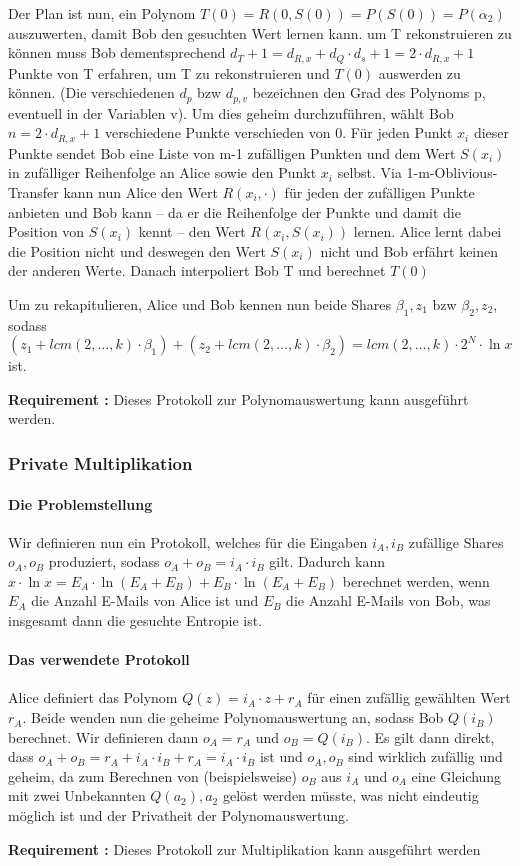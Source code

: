 \documentclass{article}
\newcounter{requirementscount}{}
\newcommand{\requirement}[1] {
        \addtocounter{requirementscount}{1}
        {\bf Requirement \therequirementscount:} #1\\
    }
\begin{document}
Der Plan ist nun, ein Polynom \(T(0) = R(0,S(0)) = P(S(0)) = P(\alpha_2)\)
auszuwerten, damit Bob den gesuchten Wert lernen kann. um T rekonstruieren
zu k\"onnen muss Bob dementsprechend 
\(d_T + 1 = d_{R,x} + d_Q \cdot d_s +1= 2\cdot d_{R,x}+1\) 
Punkte von T erfahren,
um T zu rekonstruieren und \(T(0)\) auswerden zu k\"onnen. (Die verschiedenen
\(d_p\) bzw \(d_{p,v}\) bezeichnen den Grad des Polynoms p, eventuell in der
Variablen v). Um dies geheim durchzuf\"uhren, w\"ahlt Bob \(n = 2 \cdot d_{R,x}+1\)
verschiedene Punkte verschieden von 0. F\"ur jeden Punkt \(x_i\) dieser Punkte
sendet Bob eine Liste von m-1 zuf\"alligen Punkten und dem Wert \(S(x_i)\) 
in zuf\"alliger Reihenfolge an Alice sowie den Punkt \(x_i\) selbst.
Via 1-m-Oblivious-Transfer kann nun Alice den Wert \(R(x_i, \cdot)\) f\"ur jeden
der zuf\"alligen Punkte anbieten und Bob kann -- da er die Reihenfolge der
Punkte und damit die Position von \(S(x_i)\) kennt -- den Wert \(R(x_i, S(x_i))\)
lernen. Alice lernt dabei die Position nicht und deswegen den Wert \(S(x_i)\)
nicht und Bob erf\"ahrt keinen der anderen Werte. Danach interpoliert Bob T und berechnet 
\(T(0)\)

Um zu rekapitulieren, Alice und Bob kennen nun beide Shares \(\beta_1, z_1\) bzw 
\(\beta_2, z_2\), sodass 
\((z_1 + lcm(2,\dots,k)\cdot\beta_1) + (z_2 + lcm(2,\dots,k)\cdot\beta_2)
 = lcm(2,\dots,k)\cdot2^N\cdot\ln x\) ist.
\requirement{Dieses Protokoll zur Polynomauswertung kann ausgef\"uhrt werden.}

\subsubsection{Private Multiplikation}
\paragraph{Die Problemstellung}
Wir definieren nun ein Protokoll, welches f\"ur die Eingaben \(i_A, i_B\) 
zuf\"allige Shares \(o_A, o_B\) produziert, sodass \(o_A + o_B = i_A \cdot i_B\)
gilt. Dadurch kann
\(x \cdot \ln x = E_A \cdot \ln (E_A + E_B) + E_B \cdot \ln (E_A + E_B)\) berechnet
werden, wenn \(E_A\) die Anzahl E-Mails von Alice ist und \(E_B\) die Anzahl E-Mails
von Bob, was insgesamt dann die gesuchte Entropie ist.

\paragraph{Das verwendete Protokoll}
Alice definiert das Polynom \(Q(z) = i_A \cdot z + r_A\) f\"ur einen
zuf\"allig gew\"ahlten Wert \(r_A\). Beide wenden nun die geheime 
Polynomauswertung an, sodass Bob \(Q(i_B)\) berechnet. Wir definieren
dann \(o_A = r_A\) und \(o_B = Q(i_B)\). Es gilt dann direkt, dass
\(o_A + o_B = r_A + i_A \cdot i_B + r_A = i_A \cdot i_B\) ist und
\(o_A, o_B\) sind wirklich zuf\"allig und geheim, da zum Berechnen von 
(beispielsweise) \(o_B\) aus \(i_A\) und \(o_A\) eine Gleichung
mit zwei Unbekannten \(Q(a_2), a_2\) gel\"ost werden m\"usste, was
nicht eindeutig m\"oglich ist und der Privatheit der Polynomauswertung.
\requirement{Dieses Protokoll zur Multiplikation kann ausgef\"uhrt werden}
\end{document}
